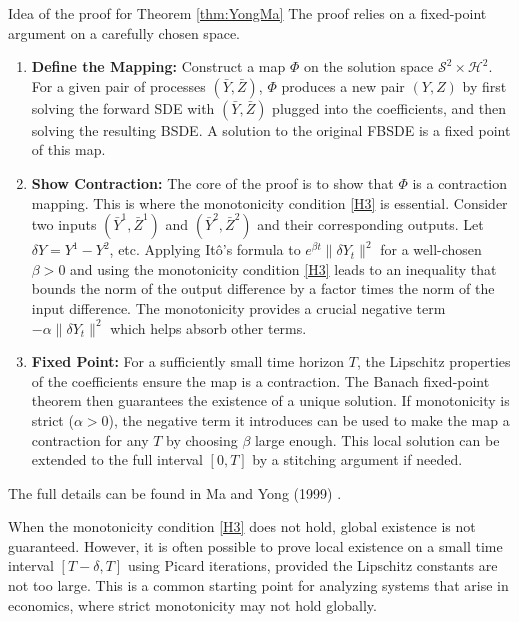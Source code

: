 \begin{leanproofbox}{Idea of the proof for Theorem \ref{thm:YongMa}}
The proof relies on a fixed-point argument on a carefully chosen space.
\begin{enumerate}
    \item \textbf{Define the Mapping:} Construct a map \(\Phi\) on the solution space \(\mathcal{S}^2 \times \mathcal{H}^2\). For a given pair of processes \((\bar{Y}, \bar{Z})\), \(\Phi\) produces a new pair \((Y,Z)\) by first solving the forward SDE with \((\bar{Y}, \bar{Z})\) plugged into the coefficients, and then solving the resulting BSDE. A solution to the original FBSDE is a fixed point of this map.
    \item \textbf{Show Contraction:} The core of the proof is to show that \(\Phi\) is a contraction mapping. This is where the monotonicity condition \ref{H3} is essential. Consider two inputs \((\bar{Y}^1, \bar{Z}^1)\) and \((\bar{Y}^2, \bar{Z}^2)\) and their corresponding outputs. Let \(\delta Y = Y^1 - Y^2\), etc. Applying Itô's formula to \(e^{\beta t}\|\delta Y_t\|^2\) for a well-chosen \(\beta > 0\) and using the monotonicity condition \ref{H3} leads to an inequality that bounds the norm of the output difference by a factor times the norm of the input difference. The monotonicity provides a crucial negative term \(-\alpha \|\delta Y_t\|^2\) which helps absorb other terms.
    \item \textbf{Fixed Point:} For a sufficiently small time horizon \(T\), the Lipschitz properties of the coefficients ensure the map is a contraction. The Banach fixed-point theorem then guarantees the existence of a unique solution. If monotonicity is strict (\(\alpha > 0\)), the negative term it introduces can be used to make the map a contraction for any \(T\) by choosing \(\beta\) large enough. This local solution can be extended to the full interval \([0,T]\) by a stitching argument if needed.
\end{enumerate}
The full details can be found in Ma and Yong (1999) \cite{MaYong1999}.
\end{leanproofbox}

\begin{remark}
When the monotonicity condition \ref{H3} does not hold, global existence is not guaranteed. However, it is often possible to prove local existence on a small time interval \([T-\delta, T]\) using Picard iterations, provided the Lipschitz constants are not too large. This is a common starting point for analyzing systems that arise in economics, where strict monotonicity may not hold globally.
\end{remark}

